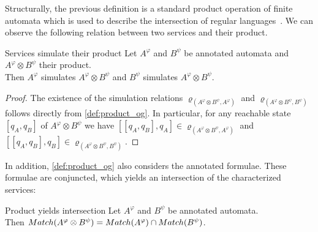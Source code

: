 Structurally, the previous definition is a standard product operation of finite automata which is used to describe the intersection of regular languages~\cite{HopcroftMU_1979}. We can observe the following relation between two services and their product.

\begin{corollary}{Services simulate their product}
\label{cor:simulationproduct}%
Let $A^{\varphi}$ and $B^{\psi}$ be annotated automata and $A^{\varphi}\otimes B^{\psi}$ their product.\\ Then $A^{\varphi}$ simulates $A^{\varphi}\otimes B^{\psi}$ and $B^{\psi}$ simulates $A^{\varphi}\otimes B^{\psi}$.
\end{corollary}

\begin{proof}
The existence of the simulation relations $\varrho_{(A^{\varphi}\otimes B^{\psi},A^{\varphi})}$ and $\varrho_{(A^{\varphi}\otimes B^{\psi},B^{\psi})}$ follows directly from \autoref{def:product_og}. In particular, for any reachable state $[q_{A},q_{B}]$ of $A^{\varphi}\otimes B^{\psi}$ we have $[[q_{A},q_{B}],q_{A}]\in\varrho_{(A^{\varphi}\otimes B^{\psi},A^{\varphi})}$ and $[[q_{A},q_{B}],q_{B}]\in\varrho_{(A^{\varphi}\otimes B^{\psi},B^{\psi})}$.
\end{proof}

In addition, \autoref{def:product_og} also considers the annotated formulae. These formulae are conjuncted, which yields an intersection of the characterized services:

\begin{lemma}{Product yields intersection}\label{lemma:productintersection}%
Let $A^{\varphi}$ and $B^{\psi}$ be annotated automata.\\ Then $\mathop{Match}(A^{\varphi}\otimes B^{\psi})=\mathop{Match}(A^{\varphi})\cap\mathop{Match}(B^{\psi})$.
\end{lemma}



